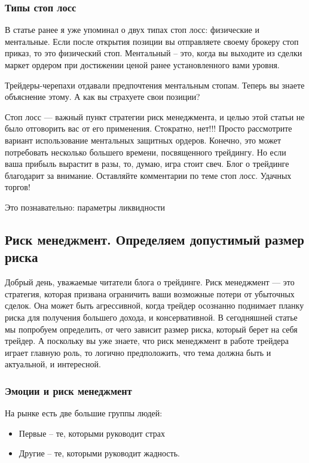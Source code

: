 \documentclass[a5paper]{article}
\begin{document}
\subsubsection{Типы стоп лосс}

В статье ранее я уже упоминал о двух типах стоп лосс: физические и ментальные. Если после открытия позиции вы отправляете своему брокеру стоп приказ, то это физический стоп. Ментальный – это, когда вы выходите из сделки маркет ордером при достижении ценой ранее установленного вами уровня.

Трейдеры-черепахи отдавали предпочтения ментальным стопам. Теперь вы знаете объяснение этому. А как вы страхуете свои позиции?

Стоп лосс — важный пункт стратегии риск менеджмента, и целью этой статьи не было отговорить вас от его применения. Стократно, нет!!! Просто рассмотрите вариант использование ментальных защитных ордеров. Конечно, это может потребовать несколько большего времени, посвященного трейдингу. Но если ваша прибыль вырастит в разы, то, думаю, игра стоит свеч. Блог о трейдинге благодарит за внимание. Оставляйте комментарии по теме стоп лосс. Удачных торгов!


Это познавательно: параметры ликвидности

\subsection{Риск менеджмент. Определяем допустимый размер риска}

Добрый день, уважаемые читатели блога о трейдинге. Риск менеджмент — это стратегия, которая призвана ограничить ваши возможные потери от убыточных сделок. Она может быть агрессивной, когда трейдер осознанно поднимает планку риска для получения большего дохода, и консервативной. В сегодняшней статье мы попробуем определить, от чего зависит размер риска, который берет на себя трейдер. А поскольку вы уже знаете, что риск менеджмент в работе трейдера играет главную роль, то логично предположить, что тема должна быть и актуальной, и интересной.

\subsubsection{Эмоции и риск менеджмент}

На рынке есть две большие группы людей:
\begin{itemize}
\item     Первые – те, которыми руководит страх
\item     Другие – те, которыми руководит жадность.
\end{itemize}
\end{document}
